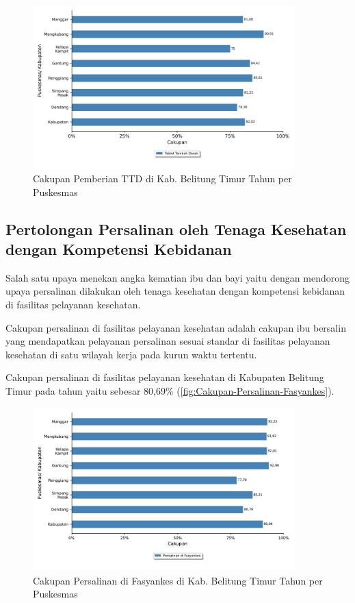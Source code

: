 \begin{figure}[H]
    \centering
    \includegraphics[width=0.9\textwidth]{bab_05/bab_05_05_TTD}
    \caption{Cakupan Pemberian TTD di Kab. Belitung Timur Tahun \tP per Puskesmas}
    \label{fig:Cakupan-TTD}
\end{figure}


\subsection{Pertolongan Persalinan oleh Tenaga Kesehatan dengan Kompetensi Kebidanan}
Salah satu upaya menekan angka kematian ibu dan bayi yaitu dengan mendorong upaya persalinan dilakukan oleh tenaga kesehatan dengan kompetensi kebidanan di fasilitas pelayanan kesehatan.

Cakupan persalinan di fasilitas pelayanan kesehatan adalah cakupan ibu bersalin yang mendapatkan pelayanan persalinan sesuai standar di fasilitas pelayanan kesehatan di satu wilayah kerja pada kurun waktu tertentu.

Cakupan persalinan di fasilitas pelayanan kesehatan di Kabupaten Belitung Timur pada tahun \tP yaitu sebesar 80,69\% (\autoref{fig:Cakupan-Persalinan-Fasyankes}).

\begin{figure}[H]
    \centering
    \includegraphics[width=0.9\textwidth]{bab_05/bab_05_05b_salinFasyankes.pdf}
    \caption{Cakupan Persalinan di Fasyankes di Kab. Belitung Timur Tahun \tP per Puskesmas}
    \label{fig:Cakupan-Persalinan-Fasyankes}
\end{figure}

